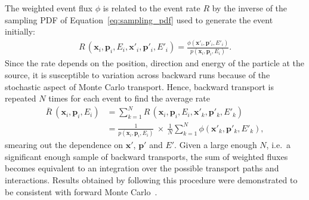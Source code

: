 The weighted event flux $\phi$ is related to the event rate $R$ by the
inverse of the sampling PDF of Equation~\ref{eq:sampling_pdf} used to generate
the event initially:
\begin{align}
R\,(\bm{x}_i, \bm{p}_i, E_i, \bm{x}'_i, \bm{p}'_i, E'_i) = 
    \frac{\phi(\bm{x}'_i, \bm{p}'_i, E'_i)}{p(\bm{x}_i, \bm{p}_i, E_i)}.
\end{align}
Since the rate depends on the position, direction and energy of the particle at
the source, it is susceptible to variation across backward runs because of the
stochastic aspect of Monte Carlo transport. Hence, backward transport is
repeated $N$ times for each event to find the average rate
\begin{align}\label{eq:avg_rate}
\overline{R}\:(\bm{x}_i, \bm{p}_i, E_i)
    &= \sum_{k=1}^N R\,(\bm{x}_i, \bm{p}_i, E_i, \bm{x}'_k, \bm{p}'_k, E'_k) \nonumber\\
    &= \frac{1}{p(\bm{x}_i, \bm{p}_i, E_i)} \ \times\ \frac{1}{N} \sum_{k=1}^N \phi(\bm{x}'_k, \bm{p}'_k, E'_k),
\end{align}
smearing out the dependence on $\bm{x}'$, $\bm{p}'$ and $E'$. Given a large
enough $N$, i.e.\ a significant enough sample of backward transports, the sum of
weighted fluxes becomes equivalent to an integration over the possible transport
paths and interactions. Results obtained by following this procedure were
demonstrated to be consistent with forward Monte
Carlo~\cite{DESORGHER2010247}.











